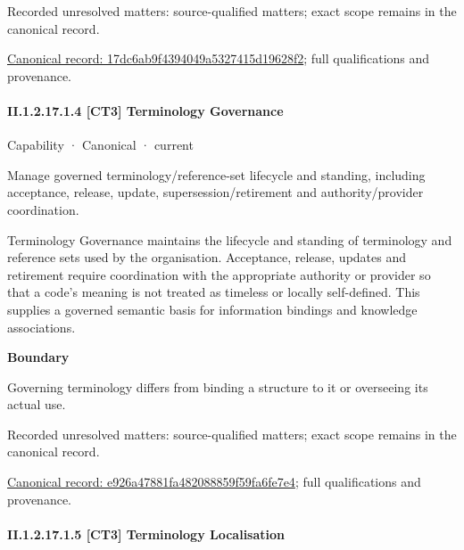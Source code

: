 {\small Recorded unresolved matters: source-qualified matters; exact scope remains in the canonical record.}\par
{\footnotesize \href{../../../../continuum/strategy/capability/17dc6ab9f4394049a5327415d19628f2.md}{Canonical record: 17dc6ab9f4394049a5327415d19628f2}; full qualifications and provenance.}\par
\paragraph*{II.1.2.17.1.4 [CT3] Terminology Governance}
\label{navigation:II.1.2.17.1.4}

\label{element:e926a47881fa482088859f59fa6fe7e4}
{\small Capability · Canonical · current}\par

Manage governed terminology/reference-set lifecycle and standing, including acceptance, release, update, supersession/retirement and authority/provider coordination.



Terminology Governance maintains the lifecycle and standing of terminology and reference sets used by the organisation. Acceptance, release, updates and retirement require coordination with the appropriate authority or provider so that a code's meaning is not treated as timeless or locally self-defined. This supplies a governed semantic basis for information bindings and knowledge associations.



\textbf{Boundary}



Governing terminology differs from binding a structure to it or overseeing its actual use.


{\small Recorded unresolved matters: source-qualified matters; exact scope remains in the canonical record.}\par
{\footnotesize \href{../../../../continuum/strategy/capability/e926a47881fa482088859f59fa6fe7e4.md}{Canonical record: e926a47881fa482088859f59fa6fe7e4}; full qualifications and provenance.}\par
\paragraph*{II.1.2.17.1.5 [CT3] Terminology Localisation}
\label{navigation:II.1.2.17.1.5}

